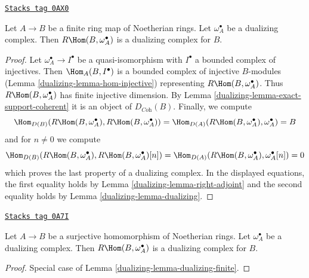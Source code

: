 \begin{lemma}
\label{dualizing-lemma-dualizing-finite}
\href{https://stacks.math.columbia.edu/tag/0AX0}{\texttt{Stacks tag 0AX0}}

Let $A \to B$ be a finite ring map of Noetherian rings.
Let $\omega_A^\bullet$ be a dualizing complex.
Then $R\Hom(B, \omega_A^\bullet)$ is a dualizing complex for $B$.
\end{lemma}

\begin{proof}

Let $\omega_A^\bullet \to I^\bullet$ be a quasi-isomorphism
with $I^\bullet$ a bounded complex of injectives.
Then $\Hom_A(B, I^\bullet)$ is a bounded complex of injective
$B$-modules (Lemma \ref{dualizing-lemma-hom-injective}) representing
$R\Hom(B, \omega_A^\bullet)$.
Thus $R\Hom(B, \omega_A^\bullet)$ has finite injective dimension.
By Lemma \ref{dualizing-lemma-exact-support-coherent} it is an object of
$D_{\textit{Coh}}(B)$. Finally, we compute
$$
\Hom_{D(B)}(R\Hom(B, \omega_A^\bullet), R\Hom(B, \omega_A^\bullet)) =
\Hom_{D(A)}(R\Hom(B, \omega_A^\bullet), \omega_A^\bullet) = B
$$
and for $n \not = 0$ we compute
$$
\Hom_{D(B)}(R\Hom(B, \omega_A^\bullet), R\Hom(B, \omega_A^\bullet)[n]) =
\Hom_{D(A)}(R\Hom(B, \omega_A^\bullet), \omega_A^\bullet[n]) = 0
$$
which proves the last property of a dualizing complex.
In the displayed equations, the first
equality holds by Lemma \ref{dualizing-lemma-right-adjoint}
and the second equality holds by Lemma \ref{dualizing-lemma-dualizing}.
\end{proof}

\begin{lemma}
\label{dualizing-lemma-dualizing-quotient}
\href{https://stacks.math.columbia.edu/tag/0A7I}{\texttt{Stacks tag 0A7I}}

Let $A \to B$ be a surjective homomorphism of Noetherian rings.
Let $\omega_A^\bullet$ be a dualizing complex.
Then $R\Hom(B, \omega_A^\bullet)$ is a dualizing complex for $B$.
\end{lemma}

\begin{proof}

Special case of Lemma \ref{dualizing-lemma-dualizing-finite}.
\end{proof}

